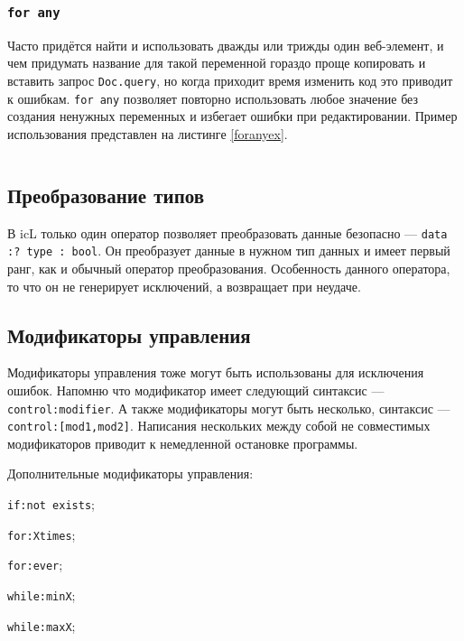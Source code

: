 \begin{sourcecode}
	\label{ifexistsex}
    \inputminted[linenos]{icl}{../sources/ifexistsex.icL}
\end{sourcecode}

\subsubsection{\texttt{for any}}

Часто придётся найти и использовать дважды или трижды один веб-элемент, и чем придумать название для такой переменной гораздо проще копировать и вставить запрос \texttt{Doc.query}, но когда приходит время изменить код это приводит к ошибкам. \texttt{for any} позволяет повторно использовать любое значение без создания ненужных переменных и избегает ошибки при редактировании. Пример использования представлен на листинге \ref{foranyex}.

\begin{sourcecode}
	\label{foranyex}
    \inputminted[linenos]{icl}{../sources/foranyex.icL}
\end{sourcecode}

\subsection{Преобразование типов}

В icL только один оператор позволяет преобразовать данные безопасно — \texttt{data :? type : bool}.
Он преобразует данные в нужном тип данных и имеет первый ранг, как и обычный оператор преобразования. Особенность данного оператора, то что он не генерирует исключений, а возвращает \void{} при неудаче.

\subsection{Модификаторы управления}

Модификаторы управления тоже могут быть использованы для исключения ошибок. Напомню что модификатор имеет следующий синтаксис — \texttt{control:modifier}. А также модификаторы могут быть несколько, синтаксис — \texttt{control:[mod1,mod2]}. Написания нескольких между собой не совместимых модификаторов приводит к немедленной остановке программы.

Дополнительные модификаторы управления: 
\begin{icItems}
	\item \texttt{if:not exists};
	\item \texttt{for:Xtimes};
	\item \texttt{for:ever};
	\item \texttt{while:minX};
	\item \texttt{while:maxX};
\end{icItems}

